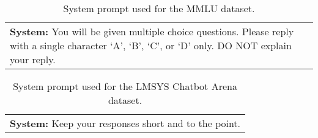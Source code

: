 \vspace{-3mm}

\begin{table}[h]
\centering
\begin{tcolorbox}[
    colframe=white,      %
    colback=gray!14,     %
    boxrule=0.5mm,       %
    arc=4mm,             %
    left=3mm,            %
    right=3mm,           %
    top=3mm,             %
    bottom=3mm           %
]
\begin{tabular}{ m{15.2cm} }
    \rowcolor{gray!14}
    \textbf{System:} You will be given multiple choice questions. Please reply with a single character `A', `B', `C', or `D' only. DO NOT explain your reply.
\end{tabular}
\end{tcolorbox}
\vspace{-3mm}
\caption{System prompt used for the MMLU dataset.}
\label{app:sys_prompt_2}
\end{table}


\vspace{-3mm}

\begin{table}[h]
\centering
\begin{tcolorbox}[
    colframe=white,      %
    colback=gray!14,     %
    boxrule=0.5mm,       %
    arc=4mm,             %
    left=3mm,            %
    right=3mm,           %
    top=3mm,             %
    bottom=3mm           %
]
\begin{tabular}{ m{15.2cm} }
    \rowcolor{gray!14}
    \textbf{System:} Keep your responses short and to the point.
\end{tabular}
\end{tcolorbox}
\vspace{-3mm}
\caption{System prompt used for the LMSYS Chatbot Arena dataset.}
\label{app:sys_prompt_3}
\end{table}




